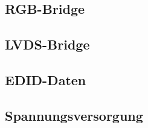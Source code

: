 \subsection{RGB-Bridge}


\subsection{LVDS-Bridge}
\subsection{EDID-Daten}
\subsection{Spannungsversorgung}
